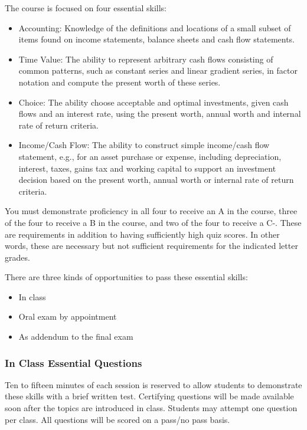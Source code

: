 \documentclass[letterpaper,10pt]{article}
\begin{document}
 The course is focused on four essential skills:
 
 \begin{itemize}
 
 \item Accounting: Knowledge of the definitions and locations of a
   small subset of items found on income statements, balance sheets and
   cash flow statements.
 
 \item Time Value: The ability to represent arbitrary cash flows
   consisting of common patterns, such as constant series and linear
   gradient series, in factor notation and compute the present worth of
   these series.
 
 \item Choice: The ability choose acceptable and optimal investments,
   given cash flows and an interest rate, using the present worth,
   annual worth and internal rate of return criteria.
 
 \item Income/Cash Flow: The ability to construct simple income/cash
   flow statement, e.g., for an asset purchase or expense, including
   depreciation, interest, taxes, gains tax and working capital to
   support an investment decision based on the present worth, annual
   worth or internal rate of return criteria.
 \end{itemize}
 

You must demonstrate proficiency in all four to receive an A in the course, three of the four to receive a B in the course, and two of the four to receive a C-.  These are requirements in addition to having sufficiently high quiz scores.  In other words, these are necessary but not sufficient requirements for the indicated letter grades.

There are three kinds of opportunities to pass these essential skills:
\begin{itemize}
    \item In class
    \item Oral exam by appointment
    \item As addendum to the final exam
\end{itemize}

 
\subsubsection{In Class Essential Questions}

Ten to fifteen minutes of each session is reserved to allow students to demonstrate these skills with a brief written test. Certifying questions will be made available soon after the topics are introduced in class. Students may attempt one question per class.  All questions will be scored on a pass/no pass basis. 
\end{document}
